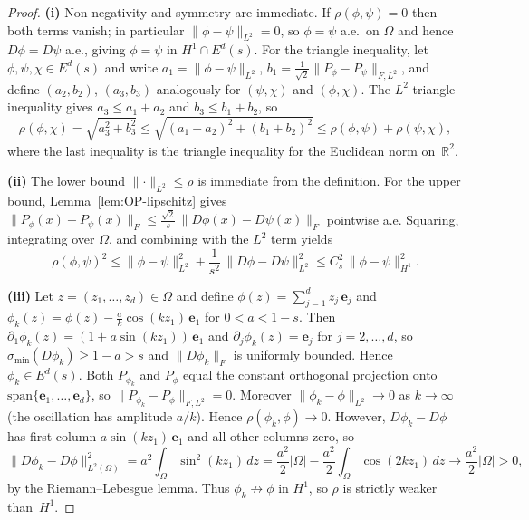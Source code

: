 \documentclass[11pt]{article}
\newcommand{\R}{\mathbb{R}}
\newcommand{\Om}{\Omega}
\newcommand{\norm}[1]{\lVert#1\rVert}
\newcommand{\abs}[1]{|#1|}
\newcommand{\sigmin}{\sigma_{\min}}
\begin{document}
\begin{proof}
  \textbf{(i)}
  Non-negativity and symmetry are immediate.
  If $\rho(\phi,\psi)=0$ then both terms vanish; in particular
  $\norm{\phi-\psi}_{L^2}=0$, so $\phi=\psi$ a.e.\ on $\Om$ and hence
  $D\phi = D\psi$ a.e., giving $\phi=\psi$ in $H^1\cap E^d(s)$.
  For the triangle inequality, let $\phi,\psi,\chi\in E^d(s)$ and
  write $a_1=\norm{\phi-\psi}_{L^2}$,
  $b_1=\tfrac{1}{\sqrt{2}}\norm{P_\phi-P_\psi}_{F,L^2}$,
  and define $(a_2,b_2)$, $(a_3,b_3)$ analogously for
  $(\psi,\chi)$ and $(\phi,\chi)$.
  The $L^2$ triangle inequality gives $a_3\le a_1+a_2$ and
  $b_3\le b_1+b_2$, so $$\rho(\phi,\chi)
    = \sqrt{a_3^2+b_3^2}
    \le \sqrt{(a_1{+}a_2)^2+(b_1{+}b_2)^2}
    \le \rho(\phi,\psi)+\rho(\psi,\chi),$$
  where the last inequality is the triangle inequality for the
  Euclidean norm on~$\R^2$.

\smallskip
  \noindent\textbf{(ii)}
  The lower bound $\norm{\cdot}_{L^2}\le\rho$ is immediate from the
  definition.
  For the upper bound, Lemma~\ref{lem:OP-lipschitz} gives
  $\norm{P_\phi(x)-P_\psi(x)}_F \le \frac{\sqrt{2}}{s}\,
  \norm{D\phi(x)-D\psi(x)}_F$
  pointwise a.e.
  Squaring, integrating over $\Om$, and combining with the $L^2$ term
  yields
   $$ \rho(\phi,\psi)^2
    \le \norm{\phi-\psi}_{L^2}^2
     + \frac{1}{s^2}\,\norm{D\phi-D\psi}_{L^2}^2
    \le C_s^2\,\norm{\phi-\psi}_{H^1}^2.$$

\smallskip
	  \noindent\textbf{(iii)}
	Let $z=(z_1,\dots,z_d)\in \Om$ and define
	  $\phi(z)=\sum_{j=1}^d z_j\,\bm e_j $ and
	 $\phi_k(z)=\phi(z)-\frac{a}{k}\cos(k z_1)\,\bm e_1$
	  for $0<a<1-s$.
	  Then
	  $\partial_1\phi_k(z)=(1+a\sin(k z_1))\,\bm e_1$ and
	  $\partial_j\phi_k(z)=\bm e_j$ for $j=2,\dots,d$, so
	  $\sigmin(D\phi_k)\ge 1-a>s$ and $\norm{D\phi_k}_F$ is uniformly
	  bounded.  Hence $\phi_k\in E^d(s)$.
	  Both $P_{\phi_k}$ and $P_\phi$ equal the constant orthogonal
	  projection onto $\mathrm{span}\{\bm e_1,\dots,\bm e_d\}$, so
	  $\norm{P_{\phi_k}-P_\phi}_{F,L^2}=0$.
	  Moreover $\norm{\phi_k-\phi}_{L^2}\to 0$ as $k\to\infty$
	  (the oscillation has amplitude $a/k$).
	  Hence $\rho(\phi_k,\phi)\to 0$.
	  However,
	  $D\phi_k - D\phi$ has first column $a\sin(k z_1)\,\bm e_1$ and all
	  other columns zero, so
	   $$ \norm{D\phi_k-D\phi}_{L^2(\Om)}^2
	    = a^2\int_\Om \sin^2(k z_1)\,dz
	    = \frac{a^2}{2}\abs{\Om}
	      -\frac{a^2}{2}\int_\Om \cos(2k z_1)\,dz
	    \rightarrow \frac{a^2}{2}\abs{\Om}>0,$$
	  by the Riemann--Lebesgue lemma.
	  Thus $\phi_k\not\to\phi$ in $H^1$, so $\rho$ is strictly weaker
	  than~$H^1$.
	\end{proof}
\end{document}
